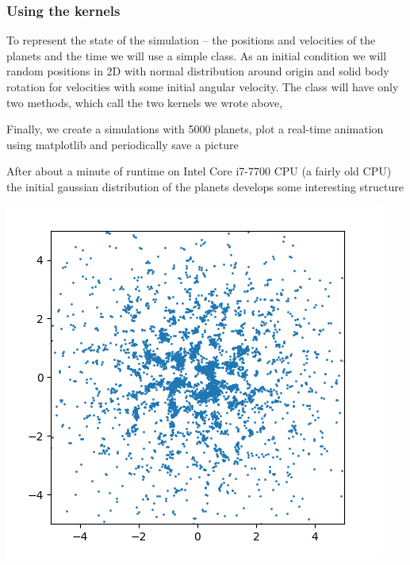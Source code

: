 \subsubsection{Using the kernels}
To represent the state of the simulation -- the positions and velocities of the planets and the time we will use a simple class. As an initial condition we will random positions in 2D with normal distribution around origin and solid body rotation for velocities with some initial angular velocity. The class will have only two methods, which call the two kernels we wrote above,


Finally, we create a simulations with 5000 planets, plot a real-time animation using matplotlib and periodically save a picture


After about a minute of runtime on Intel Core i7-7700 CPU (a fairly old CPU) the initial gaussian distribution of the planets develops some interesting structure
\begin{center}
    \includegraphics[width=0.5\linewidth]{gravity.png}
\end{center}
